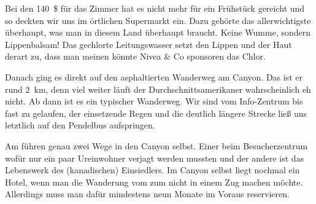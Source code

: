 Bei den 140~\$ für das Zimmer hat es nicht mehr für ein Früh\-stück gereicht und so deckten wir uns im ört\-lichen Supermarkt ein.
Dazu gehörte das allerwichtigste über\-haupt, was man in diesem Land überhaupt braucht.
Keine Wumme, sondern Lippenbalsam!
Das gechlorte Leitungswasser setzt den Lippen und der Haut derart zu, dass man meinen könnte Nivea \& Co sponsoren das Chlor.

Danach ging es direkt auf den asphaltierten Wanderweg am Canyon.
Das ist er rund 2~km, denn viel weiter läuft der Durchschnittsamerikaner wahrscheinlich eh nicht.
Ab dann ist es ein typischer Wanderweg.
Wir sind vom Info-Zentrum bis fast zu  gelaufen, der einsetzende Regen und die deutlich längere Strecke ließ uns letztlich auf den Pendelbus aufspringen.

\thispagestyle{empty}


\newpage



Am  führen genau zwei Wege in den Canyon selbst.
Einer beim Besucherzentrum wofür nur ein paar Ureinwohner verjagt werden mussten und der andere ist das Lebenswerk des (kanadischen) Einsiedlers.
Im Canyon selbst liegt nochmal ein Hotel, wenn man die Wanderung vom  zum  nicht in einem Zug machen möchte.
Allerdings muss man dafür mindestens neun Monate im Voraus reservieren.


